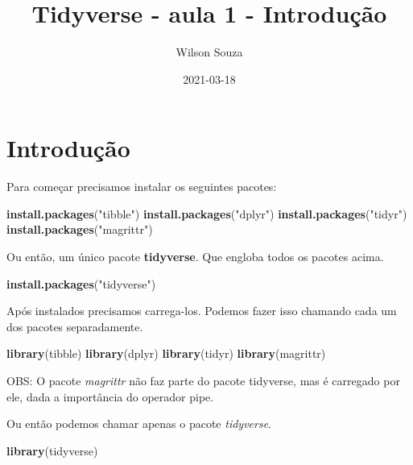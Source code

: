 \documentclass[]{book}
\title{Tidyverse - aula 1 - Introdução}
\author{Wilson Souza}
\date{2021-03-18}
\newenvironment{Shaded}{\begin{snugshade}}{\end{snugshade}}
\newcommand{\KeywordTok}[1]{\textcolor[rgb]{0.13,0.29,0.53}{\textbf{#1}}}
\newcommand{\NormalTok}[1]{#1}
\newcommand{\StringTok}[1]{\textcolor[rgb]{0.31,0.60,0.02}{#1}}
\begin{document}
\maketitle

{
\setcounter{tocdepth}{1}
\tableofcontents
}
\hypertarget{introduuxe7uxe3o}{%
\chapter{Introdução}\label{introduuxe7uxe3o}}

Para começar precisamos instalar os seguintes pacotes:

\begin{Shaded}
\begin{Highlighting}[]
\KeywordTok{install.packages}\NormalTok{(}\StringTok{"tibble"}\NormalTok{)}
\KeywordTok{install.packages}\NormalTok{(}\StringTok{"dplyr"}\NormalTok{)}
\KeywordTok{install.packages}\NormalTok{(}\StringTok{"tidyr"}\NormalTok{)}
\KeywordTok{install.packages}\NormalTok{(}\StringTok{"magrittr"}\NormalTok{)}
\end{Highlighting}
\end{Shaded}

Ou então, um único pacote \textbf{tidyverse}. Que engloba todos os pacotes acima.

\begin{Shaded}
\begin{Highlighting}[]
\KeywordTok{install.packages}\NormalTok{(}\StringTok{"tidyverse"}\NormalTok{)}
\end{Highlighting}
\end{Shaded}

Após instalados precisamos carrega-los. Podemos fazer isso chamando cada um dos pacotes separadamente.

\begin{Shaded}
\begin{Highlighting}[]
\KeywordTok{library}\NormalTok{(tibble)}
\KeywordTok{library}\NormalTok{(dplyr)}
\KeywordTok{library}\NormalTok{(tidyr)}
\KeywordTok{library}\NormalTok{(magrittr)}
\end{Highlighting}
\end{Shaded}

OBS: O pacote \emph{magrittr} não faz parte do pacote tidyverse, mas é carregado por ele, dada a importância do operador pipe.

Ou então podemos chamar apenas o pacote \emph{tidyverse}.

\begin{Shaded}
\begin{Highlighting}[]
\KeywordTok{library}\NormalTok{(tidyverse)}
\end{Highlighting}
\end{Shaded}
\end{document}
